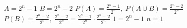 \medskip
{} 
\medskip


$A=2^n-1$\newline\newline
$B=2^n-2$\newline\newline
$P(A)=\frac{2^n-1}{2^n},\;P(A\cup{B})=\frac{2^n-2}{2^n}$\newline\newline
$P(B)=\frac{2^n-2}{2^n},\;\frac{2^n-2}{2^n}=\frac{2^n-1}{2^n}\cdot{\frac{2^n-2}{2^n}}$\newline\newline
$1=2^n-1$\newline\newline
$n=1$
